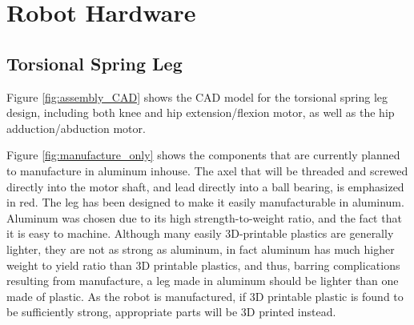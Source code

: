 \section{Robot Hardware}

\subsection{Torsional Spring Leg}

Figure \ref{fig:assembly_CAD} shows the CAD model for the torsional spring leg design, including both knee and hip extension/flexion motor, as well as the hip adduction/abduction motor. 

Figure \ref{fig:manufacture_only} shows the components that are currently planned to manufacture in aluminum inhouse. The axel that will be threaded and screwed directly into the motor shaft, and lead directly into a ball bearing, is emphasized in red. The leg has been designed to make it easily manufacturable in aluminum. Aluminum was chosen due to its high strength-to-weight ratio, and the fact that it is easy to machine. Although many easily 3D-printable plastics are generally lighter, they are not as strong as aluminum, in fact aluminum has much higher weight to yield ratio than 3D printable plastics, and thus, barring complications resulting from manufacture, a leg made in aluminum should be lighter than one made of plastic. As the robot is manufactured, if 3D printable plastic is found to be sufficiently strong, appropriate parts will be 3D printed instead. 

